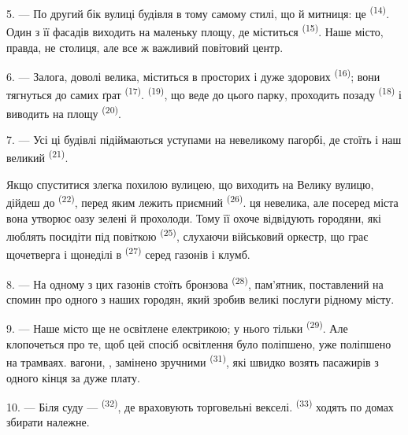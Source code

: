 5. --- По другий бік вулиці  будівля в тому самому стилі, що й
митниця: це  \textsuperscript{(14)}. Один з її фасадів виходить на
маленьку площу, де міститься  \textsuperscript{(15)}. Наше
місто, правда, не столиця, але все ж важливий повітовий центр.

\VUsaut{5.0mm}
\VUsaut{3.4mm}

6. --- Залога, доволі велика, міститься в просторих і дуже здорових
 \textsuperscript{(16)}; вони тягнуться до самих ґрат
 \textsuperscript{(17)}. 
\textsuperscript{(19)}, що веде до цього парку, проходить позаду  \textsuperscript{(18)} і виводить на площу 
\textsuperscript{(20)}.

7. --- Усі ці будівлі підіймаються уступами на невеликому пагорбі, де стоїть і
наш великий  \textsuperscript{(21)}.

Якщо спуститися злегка похилою вулицею, що виходить на Велику вулицю, дійдеш до
 \textsuperscript{(22)}, перед яким лежить приємний 
\textsuperscript{(26)}.  ця невелика, але посеред міста вона
утворює оазу зелені й прохолоди. Тому її охоче відвідують городяни, які люблять
посидіти під повіткою  \textsuperscript{(25)}, слухаючи
військовий оркестр, що грає щочетверга і щонеділі в  \textsuperscript{(27)}
серед газонів і клумб.

8. --- На одному з цих газонів стоїть бронзова 
\textsuperscript{(28)}, пам'ятник, поставлений на спомин про одного з наших
городян, який зробив великі послуги рідному місту.

\VUsaut{4.0mm}
\VUsaut{3.4mm}

9. --- Наше місто ще не освітлене електрикою; у нього тільки  \textsuperscript{(29)}. Але  клопочеться про те,
щоб цей спосіб освітлення було поліпшено,  уже поліпшено
 на трамваях.  вагони, 
, замінено зручними 
\textsuperscript{(31)}, які швидко возять пасажирів з одного кінця  за дуже  плату.

10. --- Біля суду ---  \textsuperscript{(32)}, де враховують
торговельні векселі.  \textsuperscript{(33)} ходять по
домах збирати належне.

